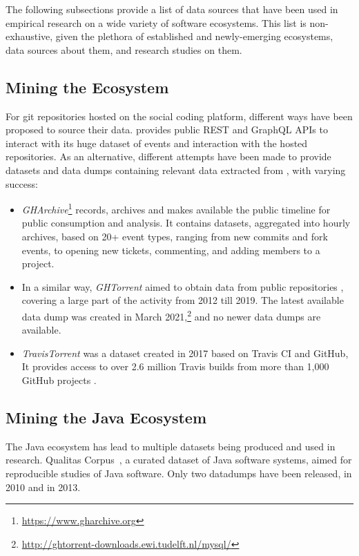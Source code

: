 The following subsections provide a list of data sources that have been used in empirical research on a wide variety of software ecosystems.
This list is non-exhaustive, given the plethora of established and newly-emerging ecosystems, data sources about them, and research studies on them.

\subsection{Mining the \github Ecosystem}

For git repositories hosted on the \github social coding platform, different ways have been proposed to source their data.
\github provides public REST and GraphQL APIs to interact with its huge dataset of events and interaction with the hosted repositories.
As an alternative, different attempts have been made to provide datasets and data dumps containing relevant data extracted from \github, with varying success:
\begin{itemize}
    \item \emph{GHArchive}\footnote{\url{https://www.gharchive.org}} records, archives and makes available the public \github timeline for public consumption and analysis. It contains datasets, aggregated into hourly archives, based on 20+ event types, ranging from new commits and fork events, to opening new tickets, commenting, and adding members to a project.
    \item In a similar way, \emph{GHTorrent} aimed to obtain data from \github public repositories \cite{GHTorrent,Gousios2017}, covering a large part of the activity from 2012 till 2019.
          The latest available data dump was created in March 2021,\footnote{\url{http://ghtorrent-downloads.ewi.tudelft.nl/mysql/}} and no newer data dumps are available.
    \item \emph{TravisTorrent} was a dataset created in 2017 based on Travis CI and GitHub, It provides access to over 2.6 million Travis builds from more than 1,000 GitHub projects \cite{Beller2017-MSR}.
\end{itemize}

\subsection{Mining the Java Ecosystem}

The Java ecosystem  has lead to multiple datasets being produced and used in research.
Qualitas Corpus~\cite{Tempero2010QualitasCorpus}, a curated dataset of Java software systems, aimed for reproducible studies of Java software. Only two datadumps have been released, in 2010 and in 2013.

